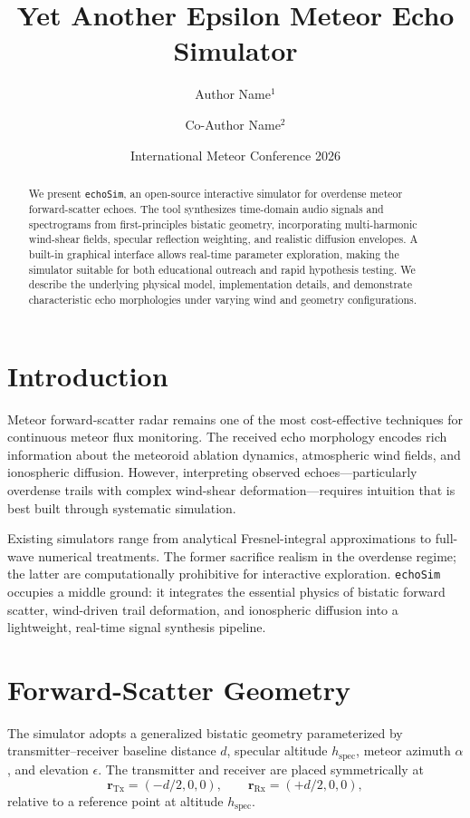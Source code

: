 \documentclass[a4paper,11pt]{article}
\title{\textbf{Yet Another Epsilon Meteor Echo Simulator}}
\author{Author Name$^{1}$ \and Co-Author Name$^{2}$}
\date{International Meteor Conference 2026}
\begin{document}
\maketitle

\begin{abstract}
We present \texttt{echoSim}, an open-source interactive simulator for overdense meteor forward-scatter echoes. The tool synthesizes time-domain audio signals and spectrograms from first-principles bistatic geometry, incorporating multi-harmonic wind-shear fields, specular reflection weighting, and realistic diffusion envelopes. A built-in graphical interface allows real-time parameter exploration, making the simulator suitable for both educational outreach and rapid hypothesis testing. We describe the underlying physical model, implementation details, and demonstrate characteristic echo morphologies under varying wind and geometry configurations.
\end{abstract}

\section{Introduction}

Meteor forward-scatter radar remains one of the most cost-effective techniques for continuous meteor flux monitoring. The received echo morphology encodes rich information about the meteoroid ablation dynamics, atmospheric wind fields, and ionospheric diffusion. However, interpreting observed echoes---particularly overdense trails with complex wind-shear deformation---requires intuition that is best built through systematic simulation.

Existing simulators range from analytical Fresnel-integral approximations to full-wave numerical treatments. The former sacrifice realism in the overdense regime; the latter are computationally prohibitive for interactive exploration. \texttt{echoSim} occupies a middle ground: it integrates the essential physics of bistatic forward scatter, wind-driven trail deformation, and ionospheric diffusion into a lightweight, real-time signal synthesis pipeline.

\section{Forward-Scatter Geometry}

The simulator adopts a generalized bistatic geometry parameterized by transmitter--receiver baseline distance $d$, specular altitude $h_{\mathrm{spec}}$, meteor azimuth $\alpha$, and elevation $\epsilon$. The transmitter and receiver are placed symmetrically at
\begin{equation}
    \mathbf{r}_{\mathrm{Tx}} = (-d/2, 0, 0), \qquad
    \mathbf{r}_{\mathrm{Rx}} = (+d/2, 0, 0),
\end{equation}
relative to a reference point at altitude $h_{\mathrm{spec}}$.
\end{document}
